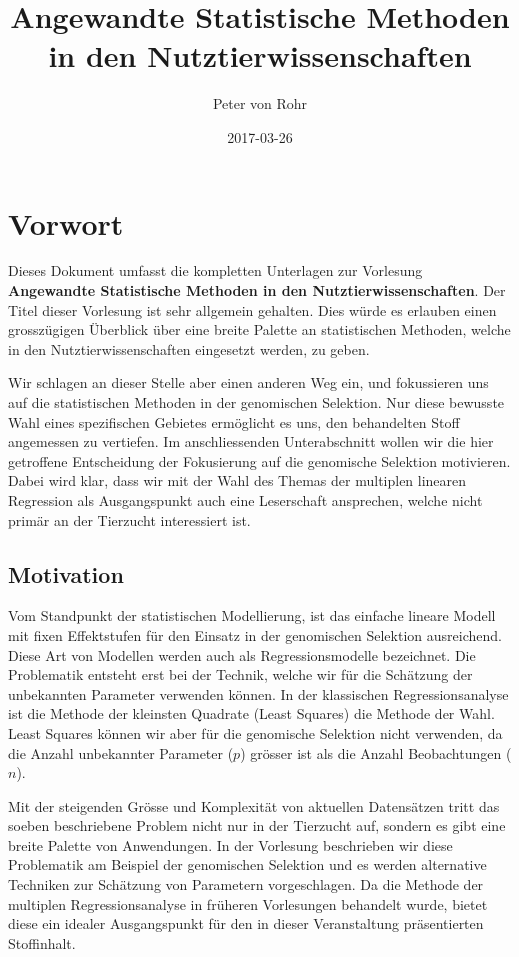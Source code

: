 \documentclass[]{book}
\title{Angewandte Statistische Methoden in den Nutztierwissenschaften}
\author{Peter von Rohr}
\date{2017-03-26}
\begin{document}
\maketitle

{
\setcounter{tocdepth}{1}
\tableofcontents
}
\chapter*{Vorwort}\label{vorwort}

Dieses Dokument umfasst die kompletten Unterlagen zur Vorlesung
\textbf{Angewandte Statistische Methoden in den Nutztierwissenschaften}.
Der Titel dieser Vorlesung ist sehr allgemein gehalten. Dies würde es
erlauben einen grosszügigen Überblick über eine breite Palette an
statistischen Methoden, welche in den Nutztierwissenschaften eingesetzt
werden, zu geben.

Wir schlagen an dieser Stelle aber einen anderen Weg ein, und
fokussieren uns auf die statistischen Methoden in der genomischen
Selektion. Nur diese bewusste Wahl eines spezifischen Gebietes
ermöglicht es uns, den behandelten Stoff angemessen zu vertiefen. Im
anschliessenden Unterabschnitt wollen wir die hier getroffene
Entscheidung der Fokusierung auf die genomische Selektion motivieren.
Dabei wird klar, dass wir mit der Wahl des Themas der multiplen linearen
Regression als Ausgangspunkt auch eine Leserschaft ansprechen, welche
nicht primär an der Tierzucht interessiert ist.

\section*{Motivation}\label{motivation}

Vom Standpunkt der statistischen Modellierung, ist das einfache lineare
Modell mit fixen Effektstufen für den Einsatz in der genomischen
Selektion ausreichend. Diese Art von Modellen werden auch als
Regressionsmodelle bezeichnet. Die Problematik entsteht erst bei der
Technik, welche wir für die Schätzung der unbekannten Parameter
verwenden können. In der klassischen Regressionsanalyse ist die Methode
der kleinsten Quadrate (Least Squares) die Methode der Wahl. Least
Squares können wir aber für die genomische Selektion nicht verwenden, da
die Anzahl unbekannter Parameter (\(p\)) grösser ist als die Anzahl
Beobachtungen (\(n\)).

Mit der steigenden Grösse und Komplexität von aktuellen Datensätzen
tritt das soeben beschriebene Problem nicht nur in der Tierzucht auf,
sondern es gibt eine breite Palette von Anwendungen. In der Vorlesung
beschrieben wir diese Problematik am Beispiel der genomischen Selektion
und es werden alternative Techniken zur Schätzung von Parametern
vorgeschlagen. Da die Methode der multiplen Regressionsanalyse in
früheren Vorlesungen behandelt wurde, bietet diese ein idealer
Ausgangspunkt für den in dieser Veranstaltung präsentierten Stoffinhalt.
\end{document}
